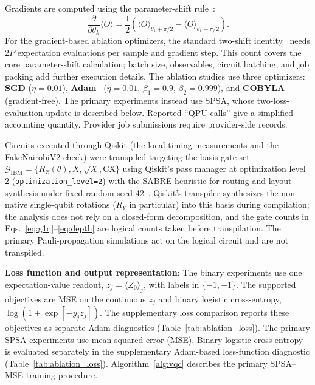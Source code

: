 \documentclass[final,5p,times,number]{elsarticle}
\begin{document}
Gradients are computed using the parameter-shift rule~\cite{schuld2019evaluating}:
\begin{equation}
  \frac{\partial}{\partial \theta_k} \langle O \rangle = \frac{1}{2} \left( \langle O \rangle_{\theta_k + \pi/2} - \langle O \rangle_{\theta_k - \pi/2} \right).
  \label{eq:param_shift}
\end{equation}
For the gradient-based ablation optimizers, the standard two-shift identity~\cite{schuld2019evaluating} needs $2P$ expectation evaluations per sample and gradient step. This count covers the core parameter-shift calculation; batch size, observables, circuit batching, and job packing add further execution details. The ablation studies use three optimizers: \textbf{SGD} ($\eta=0.01$), \textbf{Adam}~\cite{kingma2014adam} ($\eta=0.01$, $\beta_1=0.9$, $\beta_2=0.999$), and \textbf{COBYLA} (gradient-free). The primary experiments instead use SPSA, whose two-loss-evaluation update is described below. Reported ``QPU calls'' give a simplified accounting quantity. Provider job submissions require provider-side records.

Circuits executed through Qiskit (the local timing measurements and the FakeNairobiV2 check) were transpiled targeting the basis gate set $\mathcal{G}_{\text{IBM}} = \{ R_Z(\theta), X, \sqrt{X}, \text{CX} \}$ using Qiskit's pass manager at optimization level 2 (\texttt{optimization\_level=2}) with the SABRE heuristic for routing and layout synthesis under fixed random seed 42~\cite{qiskit2019}. Qiskit's transpiler synthesizes the non-native single-qubit rotations ($R_Y$ in particular) into this basis during compilation; the analysis does not rely on a closed-form decomposition, and the gate counts in Eqs.~\eqref{eq:g1q}--\eqref{eq:depth} are logical counts taken before transpilation. The primary Pauli-propagation simulations act on the logical circuit and are not transpiled.

\textbf{Loss function and output representation}: The binary experiments use one expectation-value readout, $z_j=\langle Z_0\rangle_j$, with labels in $\{-1,+1\}$. The supported objectives are MSE on the continuous $z_j$ and binary logistic cross-entropy, $\log(1+\exp[-y_jz_j])$. The supplementary loss comparison reports these objectives as separate Adam diagnostics (Table~\ref{tab:ablation_loss}). The primary SPSA experiments use mean squared error (MSE). Binary logistic cross-entropy is evaluated separately in the supplementary Adam-based loss-function diagnostic (Table~\ref{tab:ablation_loss}). Algorithm~\ref{alg:vqc} describes the primary
SPSA--MSE training procedure.
\end{document}
